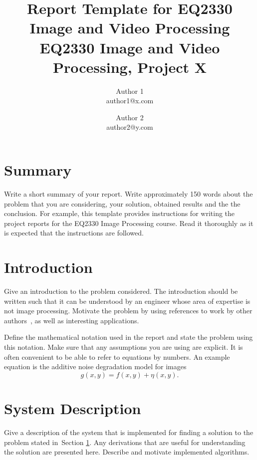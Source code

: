 \documentclass[a4paper]{article}
\begin{document}
\title{Report Template for EQ2330 Image and Video Processing\\
\large{EQ2330 Image and Video Processing, Project X}}
\author{Author 1\\ author1@x.com
  \and Author 2\\ author2@y.com}

\maketitle

\section*{Summary}
\label{sec:summary}

Write a short summary of your report. Write approximately 150 words about the
problem that you are considering, your solution, obtained results and the
the conclusion. For example, this template provides instructions for writing the
project reports for the EQ2330 Image Processing course. Read it thoroughly as it
is expected that the instructions are followed.

\section{Introduction}
\label{sec:introduction}

Give an introduction to the problem considered. The introduction should be
written such that it can be understood by an engineer whose area of expertise is
not image processing. Motivate the problem by using references to work by other
authors~\cite{coursebook}, as well as interesting applications.

Define the mathematical notation used in the report and state the problem using
this notation. Make sure that any assumptions you are using are explicit. It is
often convenient to be able to refer to equations by numbers. An example
equation is the additive noise degradation model for images
\begin{equation}
  \label{eqn:model}
  g(x,y) = f(x,y) + \eta(x,y).
\end{equation}

\section{System Description}
\label{sec:system}
Give a description of the system that is implemented for finding a solution to
the problem stated in~Section \ref{sec:introduction}. Any derivations that are
useful for understanding the solution are presented here. Describe and motivate
implemented algorithms.
\end{document}

